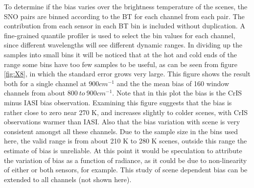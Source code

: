 \documentclass[twocolumn,10pt]{article}
\begin{document}
To determine if the bias varies over the brightness temperature of the scenes, the SNO pairs are binned according to the BT for each channel from each pair. The contribution from each sensor in each BT bin is included without duplication.  A fine-grained quantile profiler is used to select the bin values for each channel, since different wavelengths will see different dynamic ranges.  In dividing up the samples into small bins it will be noticed that at the hot and cold ends of the range some bins have too few samples to be useful, as can be seen from figure \ref{fig:X8}, in which the standard error grows very large. This figure shows the result both for a single channel at $900 cm^{-1}$ and the the mean bias of 160 window channels from about $800\ to\ 900 cm^{-1}$. Note that in this plot the bias is the CrIS minus IASI bias observation. Examining this figure suggests that the bias is rather close to zero near 270 K, and increases slightly to colder scenes, with CrIS observations warmer than IASI. Also that the bias variation with scene
is very consistent amongst all these channels. Due to the sample size in the bins used here, the valid range is from about 210 K to 280 K scenes, outside this range the estimate of bias is unreliable.
At this point it would be speculation to attribute the variation of bias as a function of radiance, as it could be due to non-linearity of either or both sensors, for example. This study of scene dependent bias can be extended to all channels (not shown here).


\end{document}
